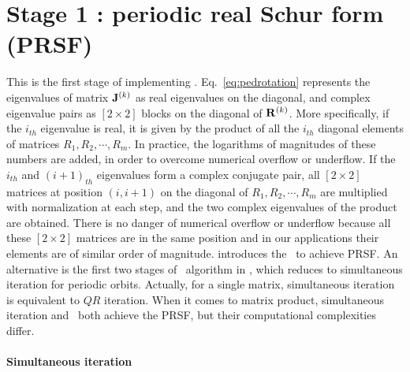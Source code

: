 \documentclass[final,leqno,onefignum,onetabnum]{siamltexmm}
\begin{document}
\section{Stage 1 :  periodic real Schur form (PRSF)}
\label{sect:psd}
This is the first stage of implementing \ped.
Eq.~\eqref{eq:pedrotation} represents the eigenvalues of matrix
$\mathbf{J}^{(k)}$ as real eigenvalues on the diagonal, and complex
eigenvalue pairs as $[2\!\times\! 2]$ blocks on the diagonal of
$\mathbf{R}^{(k)}$. More specifically, if the $i_{th}$
eigenvalue is real, it is given by the product of all the $i_{th}$
diagonal elements of matrices $R_{1},R_{2},\cdots,R_{m}$. In practice,
the logarithms of magnitudes of these numbers are added, in order to
overcome numerical {overflow or underflow}. If the $i_{th}$ and $(i+1)_{th}$
eigenvalues form a complex conjugate pair, all $[2\!\times\! 2]$ matrices
at position $(i,i+1)$ on the diagonal of $R_{1},R_{2},\cdots,R_{m}$ are
multiplied with normalization at each step, and the two complex
eigenvalues of the product are obtained. There is no danger of numerical
{overflow or underflow}
because all these $[2\!\times\! 2]$  matrices are in the same
position and  in our applications their elements are of similar order of
magnitude.
 introduces the \psd\ to achieve PRSF. An
alternative is the first two stages of {\cLv\ algorithm} in ,
which reduces to simultaneous iteration for periodic orbits.
{Actually, for a single matrix,
simultaneous iteration is equivalent to $QR$ iteration.
When it comes to matrix product, simultaneous iteration and \psd\ both
achieve the PRSF, but their computational complexities differ.}

\paragraph{Simultaneous iteration}
\end{document}
